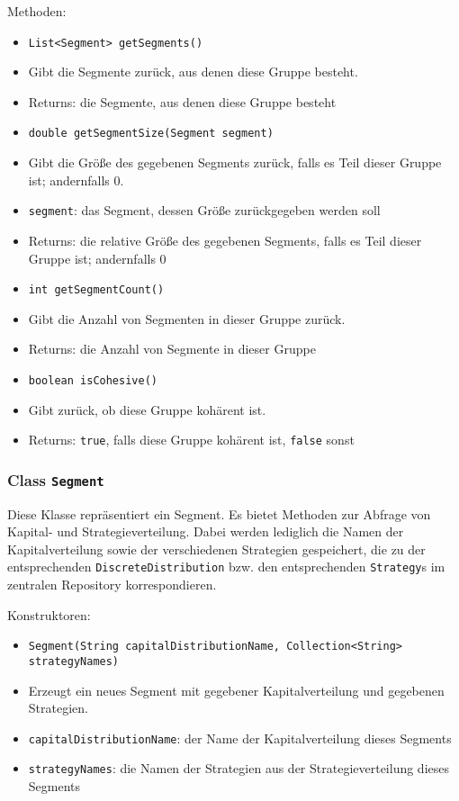 \documentclass[parskip=full,11pt]{scrartcl}
\begin{document}
Methoden:
\begin{itemize}\itemsep -10pt
\item \texttt{List<Segment> getSegments()}
\item[] Gibt die Segmente zurück, aus denen diese Gruppe besteht.
\item[] Returns: die Segmente, aus denen diese Gruppe besteht

\item \texttt{double getSegmentSize(Segment segment)}
\item[] Gibt die Größe des gegebenen Segments zurück, falls es Teil dieser Gruppe ist; andernfalls \(0\).
\item[] \texttt{segment}: das Segment, dessen Größe zurückgegeben werden soll
\item[] Returns: die relative Größe des gegebenen Segments, falls es Teil dieser Gruppe ist; andernfalls \(0\)

\item \texttt{int getSegmentCount()}
\item[] Gibt die Anzahl von Segmenten in dieser Gruppe zurück.
\item[] Returns: die Anzahl von Segmente in dieser Gruppe

\item \texttt{boolean isCohesive()}
\item[] Gibt zurück, ob diese Gruppe kohärent ist.
\item[] Returns: \texttt{true}, falls diese Gruppe kohärent ist, \texttt{false} sonst
\end{itemize}

\subsubsection{Class \texttt{Segment}}

Diese Klasse repräsentiert ein Segment. Es bietet Methoden zur Abfrage von Kapital- und Strategieverteilung. Dabei werden lediglich die Namen der Kapitalverteilung sowie der verschiedenen Strategien gespeichert, die zu der entsprechenden \texttt{DiscreteDistribution} bzw. den entsprechenden \texttt{Strategy}s im zentralen Repository korrespondieren.

Konstruktoren:
\begin{itemize}\itemsep -10pt
\item \texttt{Segment(String capitalDistributionName, Collection<String> strategyNames)}
\item[] Erzeugt ein neues Segment mit gegebener Kapitalverteilung und gegebenen Strategien.
\item[] \texttt{capitalDistributionName}: der Name der Kapitalverteilung dieses Segments
\item[] \texttt{strategyNames}: die Namen der Strategien aus der Strategieverteilung dieses Segments
\end{itemize}
\end{document}
